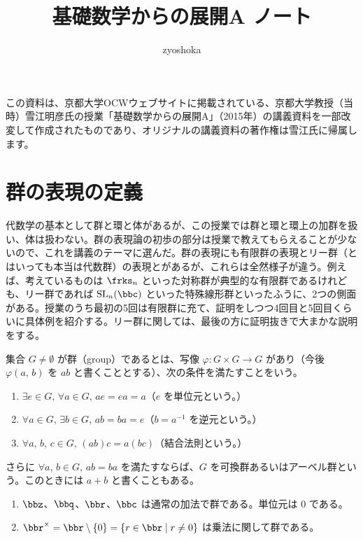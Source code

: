 \documentclass[a4paper]{ltjsarticle}
\begin{document}
\title{基礎数学からの展開A ノート}
\author{zyoshoka}
\maketitle
\thispagestyle{firstpage}

この資料は、京都大学OCWウェブサイトに掲載されている、京都大学教授（当時）雪江明彦氏の授業「基礎数学からの展開A」（2015年）の講義資料を一部改変して作成されたものであり、オリジナルの講義資料の著作権は雪江氏に帰属します。

\section{群の表現の定義}

代数学の基本として群と環と体があるが、この授業では群と環と環上の加群を扱い、体は扱わない。群の表現論の初歩の部分は授業で教えてもらえることが少ないので、これを講義のテーマに選んだ。群の表現にも有限群の表現とリー群（とはいっても本当は代数群）の表現とがあるが、これらは全然様子が違う。例えば、考えているものは $\frks_n$ といった対称群が典型的な有限群であるけれども、リー群であれば $\SL_n(\bbc)$ といった特殊線形群といったふうに、2つの側面がある。授業のうち最初の5回は有限群に充て、証明をしつつ4回目と5回目くらいに具体例を紹介する。リー群に関しては、最後の方に証明抜きで大まかな説明をする。

\begin{dfn}[群]
  集合 $G\neq\emptyset$ が群（group）であるとは、写像 $\varphi\colon G\times G\to G$ があり（今後 $\varphi(a,\,b)$ を $ab$ と書くこととする）、次の条件を満たすことをいう。
  \begin{enumerate}
    \item $\exists e\in G,\,\forall a\in G,\,ae = ea = a$（$e$ を単位元という。）
    \item $\forall a\in G,\,\exists b\in G,\,ab = ba = e$（$b = a^{-1}$ を逆元という。）
    \item $\forall a,\,b,\,c\in G,\,(ab)c = a(bc)$（結合法則という。）
  \end{enumerate}
  さらに $\forall a,\,b\in G,\,ab = ba$ を満たすならば、$G$ を可換群あるいはアーベル群という。このときには $a + b$ と書くこともある。
\end{dfn}

\begin{exm}\leavevmode
  \begin{enumerate}
    \item $\bbz$、$\bbq$、$\bbr$、$\bbc$ は通常の加法で群である。単位元は $0$ である。
    \item $\bbr^\times = \bbr\setminus\{0\} = \{r\in\bbr\mid r\neq 0\}$ は乗法に関して群である。
  \end{enumerate}
\end{exm}
\end{document}
